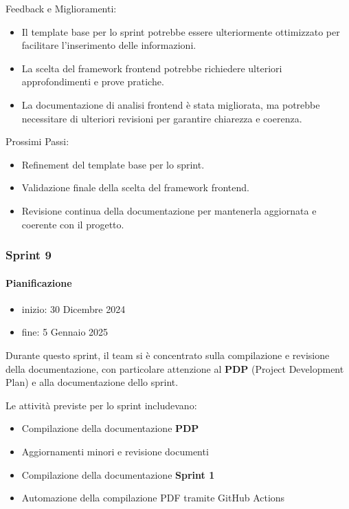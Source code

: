 \documentclass{article}
\begin{document}
                Feedback e Miglioramenti:
                \begin{itemize}
                    \item Il template base per lo sprint potrebbe essere ulteriormente ottimizzato per facilitare l'inserimento delle informazioni.
                    \item La scelta del framework frontend potrebbe richiedere ulteriori approfondimenti e prove pratiche.
                    \item La documentazione di analisi frontend è stata migliorata, ma potrebbe necessitare di ulteriori revisioni per garantire chiarezza e coerenza.
                \end{itemize}
                
                Prossimi Passi:
                \begin{itemize}
                    \item Refinement del template base per lo sprint.
                    \item Validazione finale della scelta del framework frontend.
                    \item Revisione continua della documentazione per mantenerla aggiornata e coerente con il progetto.
                \end{itemize}
            \subsubsection{Sprint 9}
                \paragraph{Pianificazione}
                \begin{itemize}
                    \item inizio: 30 Dicembre 2024
                    \item fine: 5 Gennaio 2025
                \end{itemize}
                Durante questo sprint, il team si è concentrato sulla compilazione e revisione della documentazione, con particolare attenzione al \textbf{PDP} (Project Development Plan) e alla documentazione dello sprint.

                Le attività previste per lo sprint includevano:
                \begin{itemize}
                    \item Compilazione della documentazione \textbf{PDP}
                    \item Aggiornamenti minori e revisione documenti
                    \item Compilazione della documentazione \textbf{Sprint 1}
                    \item Automazione della compilazione PDF tramite GitHub Actions
                \end{itemize}
\end{document}
